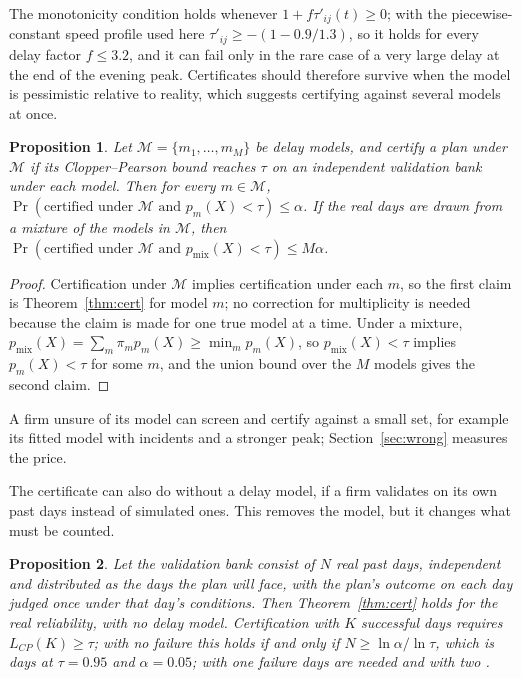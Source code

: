 \documentclass[11pt,a4paper]{article}
\newtheorem{proposition}{Proposition}
\theoremstyle{remark}
\begin{document}
The monotonicity condition holds whenever $1+f\tau'_{ij}(t)\ge0$; with the
piecewise-constant speed profile used here $\tau'_{ij}\ge-(1-0.9/1.3)$, so it holds
for every delay factor $f\le3.2$, and it can fail only in the rare case of a very
large delay at the end of the evening peak. Certificates should therefore survive
when the model is pessimistic relative to reality, which suggests certifying against
several models at once.

\begin{proposition}\label{prop:multi}
Let $\mathcal M=\{m_1,\ldots,m_M\}$ be delay models, and certify a plan under
$\mathcal M$ if its Clopper--Pearson bound reaches $\tau$ on an independent validation
bank under each model. Then for every $m\in\mathcal M$,
$\Pr(\text{certified under }\mathcal M\text{ and }p_m(X)<\tau)\le\alpha$. If the real
days are drawn from a mixture of the models in $\mathcal M$, then
$\Pr(\text{certified under }\mathcal M\text{ and }p_{\mathrm{mix}}(X)<\tau)\le M\alpha$.
\end{proposition}

\begin{proof}
Certification under $\mathcal M$ implies certification under each $m$, so the first
claim is Theorem~\ref{thm:cert} for model $m$; no correction for multiplicity is
needed because the claim is made for one true model at a time. Under a mixture,
$p_{\mathrm{mix}}(X)=\sum_m\pi_mp_m(X)\ge\min_m p_m(X)$, so $p_{\mathrm{mix}}(X)<\tau$
implies $p_m(X)<\tau$ for some $m$, and the union bound over the $M$ models gives
the second claim.
\end{proof}

A firm unsure of its model can screen and certify against a small set, for example
its fitted model with incidents and a stronger peak; Section~\ref{sec:wrong} measures
the price.

The certificate can also do without a delay model, if a firm validates on its own
past days instead of simulated ones. This removes the model, but it changes what
must be counted.

\begin{proposition}\label{prop:days}
Let the validation bank consist of $N$ real past days, independent and distributed
as the days the plan will face, with the plan's outcome on each day judged once
under that day's conditions. Then Theorem~\ref{thm:cert} holds for the real
reliability, with no delay model. Certification with $K$ successful days requires
$L_{CP}(K)\ge\tau$; with no failure this holds if and only if
$N\ge\ln\alpha/\ln\tau$, which is \LfDaysZero{} days at $\tau=0.95$ and
$\alpha=0.05$; with one failure \LfDaysOne{} days are needed and with two
\LfDaysTwo.
\end{proposition}
\end{document}
